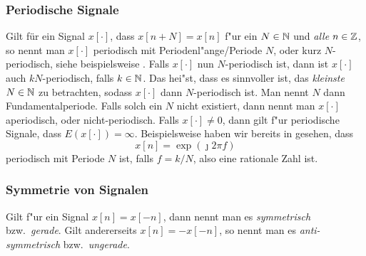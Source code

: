 \subsubsection{Periodische Signale}
%
Gilt f\"ur ein Signal $x[\cdot]$, dass $x[n + N] = x[n]$ f"ur ein $N \in \mathbb{N}$ und \emph{alle} $n \in \mathbb{Z}$, so nennt man $x[\cdot]$ periodisch mit Periodenl"ange/Periode $N$, oder kurz $N$-periodisch, siehe beispielsweise .
Falls $x[\cdot]$ nun $N$-periodisch ist, dann ist $x[\cdot]$ auch $kN$-periodisch, falls $k \in \mathbb{N}$.
Das hei"st, dass es sinnvoller ist, das \emph{kleinste} $N \in \mathbb{N}$ zu betrachten, sodass $x[\cdot]$ dann $N$-periodisch ist. 
Man nennt $N$ dann Fundamentalperiode.
Falls solch ein $N$ nicht existiert, dann nennt man $x[\cdot]$ aperiodisch, oder nicht-periodisch.
Falls $x[\cdot] \neq 0$, dann gilt f"ur periodische Signale, dass $E(x[\cdot]) = \infty$.
Beispielsweise haben wir bereits in  gesehen, dass
\[
x[n] = \exp(\jmath 2 \pi f)
\]
periodisch mit Periode $N$ ist, falls $f = k/N$, also eine rationale Zahl ist.
%
\subsubsection{Symmetrie von Signalen}
%
Gilt f"ur ein Signal $x[n] = x[-n]$, dann nennt man es \emph{symmetrisch} bzw.~\emph{gerade}.
Gilt andererseits $x[n] = -x[-n]$, so nennt man es \emph{anti-symmetrisch} bzw.~\emph{ungerade}.

